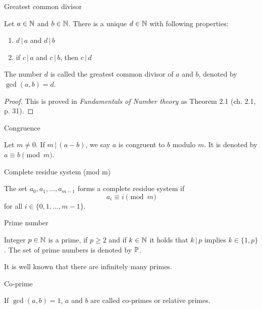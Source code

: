 \documentclass{article}
\begin{document}
\begin{theorem}
Greatest common divisor

Let $a \in \mathbb{N}$ and $b \in \mathbb{N}$. There is a unique $d \in \mathbb{N}$ with following properties:

\begin{enumerate}
 \item $d \,\vert\, a$ and $d \,\vert\, b$
 \item if $c \,\vert\, a$ and $c \,\vert\, b$, then $c \,\vert\, d$
\end{enumerate}

The number $d$ is called the greatest common divisor of $a$ and $b$, denoted by $\gcd(a,b) = d$.

\begin{proof}
This is proved in \textit{Fundamentals of Number theory} \cite{LeVeque} as Theorem 2.1 (ch. 2.1, p. 31).
\end{proof}
\end{theorem}

\begin{definition}
Congruence

Let $m\not=0$. If $m\,\vert\,(a-b)$, we say $a$ is congruent to $b$ modulo $m$. It is denoted by $a\equiv b \pmod{m}$.
\end{definition}

\begin{definition}
Complete residue system (mod m)

The set $a_0,a_1,\dots,a_{m-1}$ forms a complete residue system if
\begin{equation*}
    a_i \equiv i \pmod{m}
\end{equation*}
for all $i\in\{0,1,\dots,m-1\}$.
\end{definition}

\begin{definition}
Prime number

Integer $p\in\mathbb{N}$ is a prime, if $p \geq 2$ and if $k\in\mathbb{N}$ it holds that $k \,\vert\, p$ implies $k\in\{1, p\}$. The set of prime numbers is denoted by $\mathbb{P}$.

It is well known that there are infinitely many primes.


\end{definition}

\begin{definition}
Co-prime

If $\gcd(a,b) = 1$, $a$ and $b$ are called co-primes or relative primes.
\end{definition}
\end{document}
